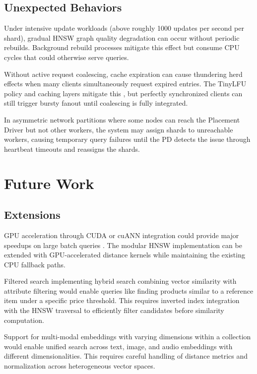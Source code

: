 \documentclass[conference]{IEEEtran}
\begin{document}
\subsection{Unexpected Behaviors}

Under intensive update workloads (above roughly 1000 updates per second per shard), gradual HNSW graph quality degradation can occur without periodic rebuilds. Background rebuild processes mitigate this effect but consume CPU cycles that could otherwise serve queries.

Without active request coalescing, cache expiration can cause thundering herd effects when many clients simultaneously request expired entries. The TinyLFU policy and caching layers mitigate this \cite{tinyLFU}, but perfectly synchronized clients can still trigger bursty fanout until coalescing is fully integrated.

In asymmetric network partitions where some nodes can reach the Placement Driver but not other workers, the system may assign shards to unreachable workers, causing temporary query failures until the PD detects the issue through heartbeat timeouts and reassigns the shards.

\section{Future Work}

\subsection{Extensions}

GPU acceleration through CUDA or cuANN integration could provide major speedups on large batch queries \cite{gpuann}. The modular HNSW implementation can be extended with GPU-accelerated distance kernels while maintaining the existing CPU fallback paths.

Filtered search implementing hybrid search combining vector similarity with attribute filtering would enable queries like finding products similar to a reference item under a specific price threshold. This requires inverted index integration with the HNSW traversal to efficiently filter candidates before similarity computation.

Support for multi-modal embeddings with varying dimensions within a collection would enable unified search across text, image, and audio embeddings with different dimensionalities. This requires careful handling of distance metrics and normalization across heterogeneous vector spaces.
\end{document}
